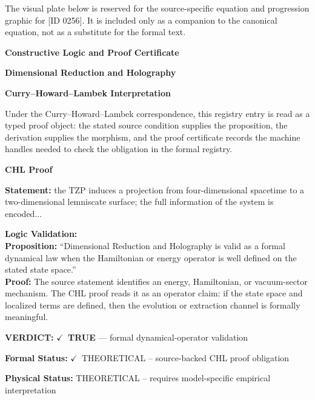 \begingroup\footnotesize\sloppy
The visual plate below is reserved for the source-specific equation and progression graphic for [ID 0256]. It is included only as a companion to the canonical equation, not as a substitute for the formal text.
\par\endgroup
\ifTZPDarkEdition
{}
\fi

\clearpage
\begingroup\tzpsupportsetup
\noindent\textbf{\fontsize{10.8pt}{12.8pt}\selectfont [ID 0256] Constructive Logic and Proof Certificate}\par
\noindent\textbf{\fontsize{10pt}{12pt}\selectfont Dimensional Reduction and Holography}\par
\vspace{0.45em}
\begingroup
\footnotesize
\setlength{\parskip}{0.22em}
\setlength{\parindent}{0pt}
\noindent\textbf{Curry--Howard--Lambek Interpretation}\par
Under the Curry--Howard--Lambek correspondence, this registry entry is read as a typed proof
object: the stated source condition supplies the proposition, the derivation supplies the
morphism, and the proof certificate records the machine handles needed to check the obligation
in the formal registry.

\vspace{0.45em}
\noindent\textbf{CHL Proof}\par
\textbf{Statement:} the TZP induces a projection from four-dimensional spacetime to a two-dimensional
lemniscate surface; the full information of the system is encoded...

\textbf{Logic Validation:}\\
\textbf{Proposition:} ``Dimensional Reduction and Holography is valid as a formal dynamical law when the
Hamiltonian or energy operator is well defined on the stated state space.''\\
\textbf{Proof:} The source statement identifies an energy, Hamiltonian, or vacuum-sector mechanism. The
CHL proof reads it as an operator claim: if the state space and localized terms are
defined, then the evolution or extraction channel is formally meaningful.

\textbf{VERDICT:} \ensuremath{\checkmark}\ \textbf{TRUE} --- formal dynamical-operator validation

\textbf{Formal Status:} \ensuremath{\checkmark}\ THEORETICAL -- source-backed CHL proof obligation

\textbf{Physical Status:} THEORETICAL -- requires model-specific empirical interpretation
\par\vspace{0.45em}
\par
\ifTZPDarkEdition
{}
\fi
\endgroup
\endgroup
